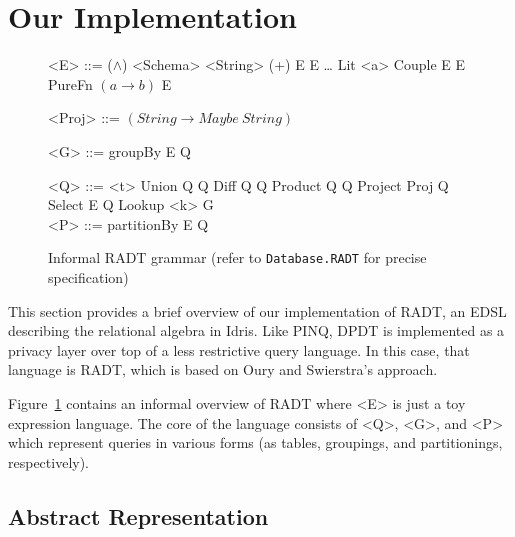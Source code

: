 \documentclass[12pt]{report}
\begin{document}
\section{Our Implementation}

\begin{figure}[H]
\begin{mdframed}
\begin{minipage}[t]{0.5\textwidth}
  \begin{grammar}
    <E> ::= \phantom
    \alt ($\land$) <Schema> <String>
    \alt (+) E E
    \alt \ldots
    \alt Lit <a>
    \alt Couple E E
    \alt PureFn $(a \rightarrow b)$ E

    <Proj> ::= $(String \rightarrow Maybe\ String)$

    <G> ::= \phantom
    \alt groupBy E Q
  \end{grammar}
\end{minipage} %
\begin{minipage}[t]{0.5\textwidth}
  \begin{grammar}
    <Q> ::= \phantom
    \alt <t>
    \alt Union Q Q
    \alt Diff Q Q
    \alt Product Q Q
    \alt Project Proj Q
    \alt Select E Q
    \alt Lookup <k> G
    \\

    <P> ::= \phantom
    \alt partitionBy E Q
  \end{grammar}
\end{minipage}
\end{mdframed}
\caption{Informal RADT grammar (refer to \texttt{Database.RADT} for precise specification)}
\label{gram:radt}
\end{figure}

This section provides a brief overview of our implementation of RADT, an EDSL describing the relational algebra in Idris.
Like PINQ, DPDT is implemented as a privacy layer over top of a less restrictive query language.
In this case, that language is RADT, which is based on Oury and Swierstra's approach\cite{OurySwierstra08PowerOfPi}.

Figure~\ref{gram:radt} contains an informal overview of RADT where <E> is just a toy expression language.
The core of the language consists of <Q>, <G>, and <P> which represent queries in various forms (as tables, groupings, and partitionings, respectively).

\subsection{Abstract Representation}
\end{document}
